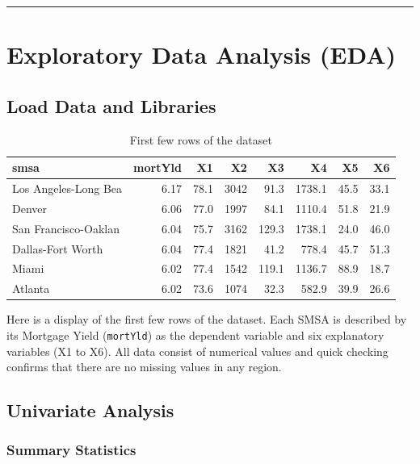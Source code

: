 \documentclass[
  11pt,
]{article}
\begin{document}
\begin{center}\rule{0.5\linewidth}{0.5pt}\end{center}

\section{Exploratory Data Analysis
(EDA)}\label{exploratory-data-analysis-eda}

\subsection{Load Data and Libraries}\label{load-data-and-libraries}

\begingroup\fontsize{8}{10}\selectfont

\begin{longtable}[t]{lrrrrrrr}
\caption{\label{tab:unnamed-chunk-1}First few rows of the dataset}\\
\toprule
smsa & mortYld & X1 & X2 & X3 & X4 & X5 & X6\\
\midrule
Los Angeles-Long Bea & 6.17 & 78.1 & 3042 & 91.3 & 1738.1 & 45.5 & 33.1\\
Denver & 6.06 & 77.0 & 1997 & 84.1 & 1110.4 & 51.8 & 21.9\\
San Francisco-Oaklan & 6.04 & 75.7 & 3162 & 129.3 & 1738.1 & 24.0 & 46.0\\
Dallas-Fort Worth & 6.04 & 77.4 & 1821 & 41.2 & 778.4 & 45.7 & 51.3\\
Miami & 6.02 & 77.4 & 1542 & 119.1 & 1136.7 & 88.9 & 18.7\\
\addlinespace
Atlanta & 6.02 & 73.6 & 1074 & 32.3 & 582.9 & 39.9 & 26.6\\
\bottomrule
\end{longtable}
\endgroup{}

Here is a display of the first few rows of the dataset. Each SMSA is
described by its Mortgage Yield (\texttt{mortYld}) as the dependent
variable and six explanatory variables (X1 to X6). All data consist of
numerical values and quick checking confirms that there are no missing
values in any region.

\subsection{Univariate Analysis}\label{univariate-analysis}

\subsubsection{Summary Statistics}\label{summary-statistics}
\end{document}
